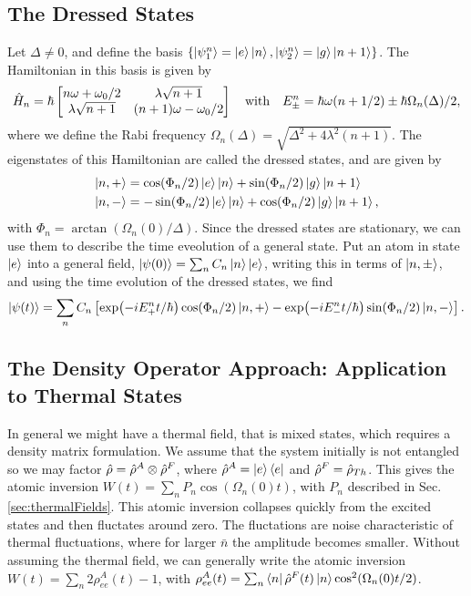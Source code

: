 \subsection{The Dressed States}
Let $\Delta \neq 0$, and define the basis $\{\ket{\psi_1^n}=\ket{e}\ket{n}, \ket{\psi_2^n}=\ket{g}\ket{n+1}\}$. The Hamiltonian in this basis is given by
\begin{equation}
    \hat{H}_n = \hbar
    \begin{bmatrix}
        n\omega + \omega_0/2 & \lambda\sqrt{n+1}\\
        \lambda\sqrt{n+1} & (n+1)\omega -\omega_0/2
    \end{bmatrix}
    \quad\text{with}\quad
    E_\pm^n = \hbar\omega(n+1/2) \pm \hbar\Omega_n(\Delta)/2,
\end{equation}
where we define the Rabi frequency $\Omega_n(\Delta) = \sqrt{\Delta^2 + 4\lambda^2(n+1)}$. The eigenstates of this Hamiltonian are called the dressed states, and are given by
\begin{align}
    \ket{n,+} &= \cos(\Phi_n/2)\ket{e}\ket{n} + \sin(\Phi_n/2)\ket{g}\ket{n+1} \\
    \ket{n,-} &= -\sin(\Phi_n/2)\ket{e}\ket{n} + \cos(\Phi_n/2)\ket{g}\ket{n+1},
\end{align}
with $\Phi_n = \arctan(\Omega_n(0)/\Delta)$. Since the dressed states are stationary, we can use them to describe the time eveolution of a general state. Put an atom in state $\ket{e}$ into a general field, $\ket{\psi(0)} = \sum_n C_n \ket{n}\ket{e}$, writing this in terms of $\ket{n, \pm}$, and using the time evolution of the dressed states, we find
\begin{equation}
    \ket{\psi(t)} = \sum_n C_n \left[ \exp(-i E_+^n t /\hbar) \cos(\Phi_n/2)\ket{n,+} - \exp(-i E_-^n t /\hbar)\sin(\Phi_n/2) \ket{n,-} \right].
\end{equation}


\subsection{The Density Operator Approach: Application to Thermal States}
In general we might have a thermal field, that is mixed states, which requires a density matrix formulation. We assume that the system initially is not entangled so we may factor $\hat{\rho} = \hat{\rho}^A \otimes \hat{\rho}^F$, where $\hat{\rho}^A = \ket{e}\bra{e}$ and $\hat{\rho}^F = \hat{\rho}_{Th}$. This gives the atomic inversion $W(t) = \sum_n P_n \cos(\Omega_n(0)t)$, with $P_n$ described in Sec. \ref{sec:thermalFields}. This atomic inversion collapses quickly from the excited states and then fluctates around zero. The fluctations are noise characteristic of thermal fluctuations, where for larger $\bar{n}$ the amplitude becomes smaller. Without assuming the thermal field, we can generally write the atomic inversion $W(t) = \sum_n 2\rho_{ee}^A(t) - 1$, with $\rho_{ee}^A(t) = \sum_n \bra{n} \hat{\rho}^F(t)\ket{n} \cos^2(\Omega_n(0)t/2 )$. 